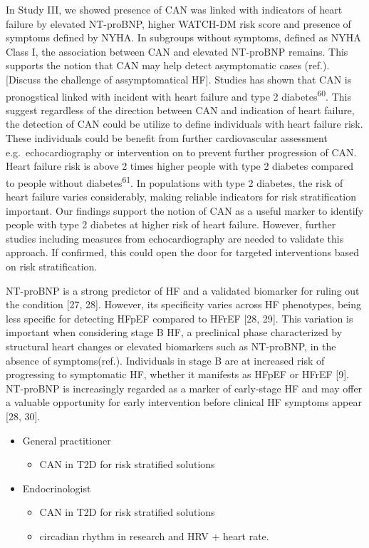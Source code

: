 \documentclass[
  a4paper,
  headsepline=true,
  open=any]{scrbook}
\providecommand{\tightlist}{%
  \setlength{\itemsep}{0pt}\setlength{\parskip}{0pt}}\usepackage{longtable,booktabs,array}
\begin{document}
In Study III, we showed presence of CAN was linked with indicators of
heart failure by elevated NT-proBNP, higher WATCH-DM risk score and
presence of symptoms defined by NYHA. In subgroups without symptoms,
defined as NYHA Class I, the association between CAN and elevated
NT-proBNP remains. This supports the notion that CAN may help detect
asymptomatic cases (ref.). {[}Discuss the challenge of assymptomatical
HF{]}. Studies has shown that CAN is pronogstical linked with incident
with heart failure and type 2 diabetes\textsuperscript{60}. This suggest
regardless of the direction between CAN and indication of heart failure,
the detection of CAN could be utilize to define individuals with heart
failure risk. These individuals could be benefit from further
cardiovascular assessment e.g.~echocardiography or intervention on to
prevent further progression of CAN. Heart failure risk is above 2 times
higher people with type 2 diabetes compared to people without
diabetes\textsuperscript{61}. In populations with type 2 diabetes, the
risk of heart failure varies considerably, making reliable indicators
for risk stratification important. Our findings support the notion of
CAN as a useful marker to identify people with type 2 diabetes at higher
risk of heart failure. However, further studies including measures from
echocardiography are needed to validate this approach. If confirmed,
this could open the door for targeted interventions based on risk
stratification.

NT-proBNP is a strong predictor of HF and a validated biomarker for
ruling out the condition {[}27, 28{]}. However, its specificity varies
across HF phenotypes, being less specific for detecting HFpEF compared
to HFrEF {[}28, 29{]}. This variation is important when considering
stage B HF, a preclinical phase characterized by structural heart
changes or elevated biomarkers such as NT-proBNP, in the absence of
symptoms(ref.). Individuals in stage B are at increased risk of
progressing to symptomatic HF, whether it manifests as HFpEF or HFrEF
{[}9{]}. NT-proBNP is increasingly regarded as a marker of early-stage
HF and may offer a valuable opportunity for early intervention before
clinical HF symptoms appear {[}28, 30{]}.

\begin{itemize}
\tightlist
\item
  General practitioner

  \begin{itemize}
  \tightlist
  \item
    CAN in T2D for risk stratified solutions
  \end{itemize}
\item
  Endocrinologist

  \begin{itemize}
  \tightlist
  \item
    CAN in T2D for risk stratified solutions
  \item
    circadian rhythm in research and HRV + heart rate.
  \end{itemize}
\end{itemize}
\end{document}
